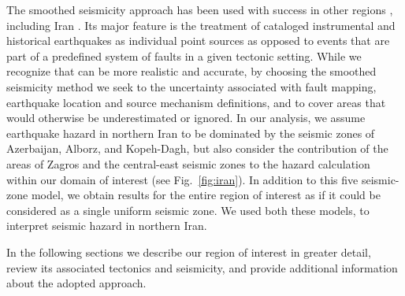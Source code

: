  The smoothed seismicity approach has been used with success in other regions \citep[e.g.][]{Cao1996, Akinci2004, Kalkan2009}, including Iran \citep{Khodaverdian_2016_BSSA}. Its major feature is the treatment of cataloged instrumental and historical earthquakes as individual point sources as opposed to events that are part of a predefined system of faults in a given tectonic setting. While we recognize that  can be more realistic and accurate, by choosing the smoothed seismicity method we seek to  the uncertainty associated with fault mapping, earthquake location and source mechanism definitions, and to cover areas that would otherwise be underestimated or ignored. In our analysis, we assume earthquake hazard in northern Iran to be dominated by the seismic zones of Azerbaijan, Alborz, and Kopeh-Dagh, but also consider the contribution of the areas of Zagros and the central-east seismic zones to the hazard calculation within our domain of interest (see Fig.~\ref{fig:iran}). In addition to this five seismic-zone model, we obtain results for the entire region of interest as if it could be considered as a single uniform seismic zone. We used both these models,  to interpret seismic hazard in northern Iran.

In the following sections we describe our region of interest in greater detail, review its associated tectonics and seismicity, and provide additional information about the adopted approach. 
